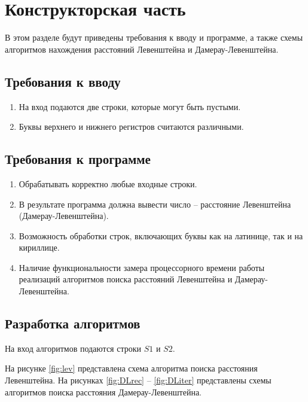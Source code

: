\chapter{Конструкторская часть}

В этом разделе будут приведены требования к вводу и программе, а также схемы алгоритмов нахождения расстояний Левенштейна и Дамерау-Левенштейна.

\section{Требования к вводу}
\begin{enumerate}
	\item На вход подаются две строки, которые могут быть пустыми.
	\item Буквы верхнего и нижнего регистров считаются различными.
\end{enumerate}

\section{Требования к программе}
\begin{enumerate}
	\item Обрабатывать корректно любые входные строки.
	\item В результате программа должна вывести число -- расстояние Левенштейна (Дамерау-Левенштейна).
	\item Возможность обработки строк, включающих буквы как на латинице, так и на кириллице.
	\item Наличие функциональности замера процессорного времени работы реализаций алгоритмов поиска расстояний Левенштейна и Дамерау-Левенштейна.
\end{enumerate}


\section{Разработка алгоритмов}

На вход алгоритмов подаются строки $S1$ и $S2$.

На рисунке \ref{fig:lev} представлена схема алгоритма поиска расстояния Левенштейна. На рисунках \ref{fig:DLrec} -- \ref{fig:DLiter} представлены схемы алгоритмов поиска расстояния Дамерау-Левенштейна.

